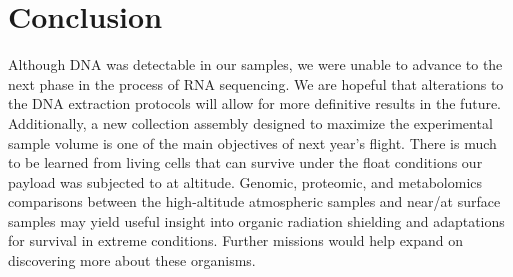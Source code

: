 \section{Conclusion}
\label{sec:Conclusion}
%
%
Although DNA was detectable in our samples, we were unable to advance to the next phase in the process of RNA sequencing. We are hopeful that alterations to the DNA extraction protocols will allow for more definitive results in the future. Additionally, a new collection assembly designed to maximize the experimental sample volume is one of the main objectives of next year’s flight. There is much to be learned from living cells that can survive under the float conditions our payload was subjected to at altitude. Genomic, proteomic, and metabolomics comparisons between the high-altitude atmospheric samples and near/at surface samples may yield useful insight into organic radiation shielding and adaptations for survival in extreme conditions. Further missions would help expand on discovering more about these organisms.

